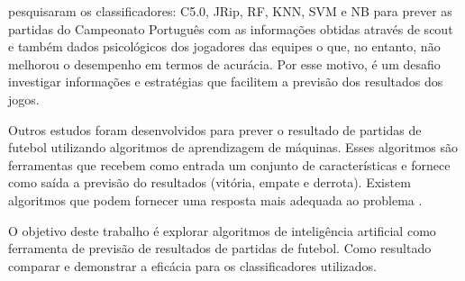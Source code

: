  pesquisaram os classificadores: C5.0, JRip, RF, KNN, SVM e NB para prever as partidas do Campeonato Português com as informações obtidas através de scout e também dados psicológicos dos jogadores das equipes o que, no entanto, não melhorou o desempenho em termos de acurácia. Por esse motivo, é um desafio investigar informações e estratégias que facilitem a previsão dos resultados dos jogos.

Outros estudos foram desenvolvidos para prever o resultado de partidas de futebol utilizando algoritmos de aprendizagem de máquinas. Esses algoritmos são ferramentas que recebem como entrada um conjunto de características e fornece como saída a previsão do resultados (vitória, empate e derrota). Existem algoritmos que podem fornecer uma resposta mais adequada ao problema \cite{Pendharkar2000}.

O objetivo deste trabalho é explorar algoritmos de inteligência artificial como ferramenta de previsão de resultados de partidas de futebol. Como resultado comparar e demonstrar a eficácia para os classificadores utilizados.